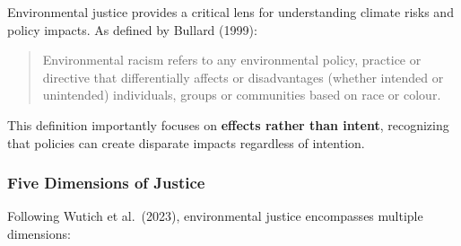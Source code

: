 \documentclass[
  letterpaper,
  DIV=11,
  numbers=noendperiod]{scrreprt}
\begin{document}
Environmental justice provides a critical lens for understanding climate
risks and policy impacts. As defined by Bullard (1999):

\begin{quote}
Environmental racism refers to any environmental policy, practice or
directive that differentially affects or disadvantages (whether intended
or unintended) individuals, groups or communities based on race or
colour.
\end{quote}

This definition importantly focuses on \textbf{effects rather than
intent}, recognizing that policies can create disparate impacts
regardless of intention.

\subsubsection{Five Dimensions of
Justice}\label{five-dimensions-of-justice}

Following Wutich et al.~(2023), environmental justice encompasses
multiple dimensions:
\end{document}

